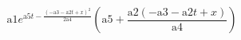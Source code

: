 \documentclass{article}
\begin{document}
\[\text{a1} e^{\text{a5} t-\frac{(-\text{a3}-\text{a2} t+x)^2}{2 \text{a4}}} \left(\text{a5}+\frac{\text{a2} (-\text{a3}-\text{a2} t+x)}{\text{a4}}\right)\]
\end{document}
